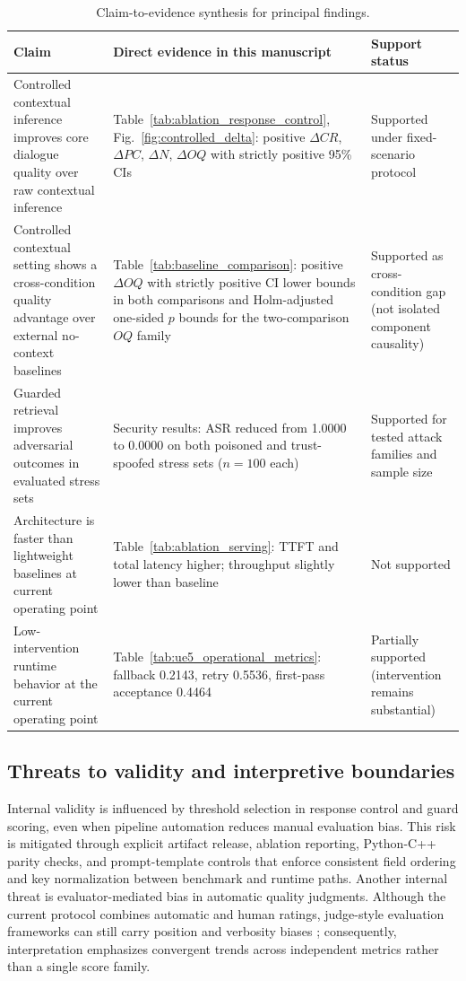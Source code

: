 ﻿\documentclass[a4paper,12pt]{article}
\begin{document}
\begin{table}[t]
\centering
\caption{Claim-to-evidence synthesis for principal findings.}
\label{tab:claim_evidence_map}
\begingroup
\footnotesize
\setlength{\tabcolsep}{4pt}
\begin{tabular}{p{}p{}p{}}
\toprule
Claim & Direct evidence in this manuscript & Support status \\
\midrule
Controlled contextual inference improves core dialogue quality over raw contextual inference & Table~\ref{tab:ablation_response_control}, Fig.~\ref{fig:controlled_delta}: positive \(\Delta CR\), \(\Delta PC\), \(\Delta N\), \(\Delta OQ\) with strictly positive 95\% CIs & Supported under fixed-scenario protocol \\
Controlled contextual setting shows a cross-condition quality advantage over external no-context baselines & Table~\ref{tab:baseline_comparison}: positive \(\Delta OQ\) with strictly positive CI lower bounds in both comparisons and Holm-adjusted one-sided \(p\) bounds for the two-comparison \(OQ\) family & Supported as cross-condition gap (not isolated component causality) \\
Guarded retrieval improves adversarial outcomes in evaluated stress sets & Security results: ASR reduced from 1.0000 to 0.0000 on both poisoned and trust-spoofed stress sets (\(n=100\) each) & Supported for tested attack families and sample size \\
Architecture is faster than lightweight baselines at current operating point & Table~\ref{tab:ablation_serving}: TTFT and total latency higher; throughput slightly lower than baseline & Not supported \\
Low-intervention runtime behavior at the current operating point & Table~\ref{tab:ue5_operational_metrics}: fallback 0.2143, retry 0.5536, first-pass acceptance 0.4464 & Partially supported (intervention remains substantial) \\
\bottomrule
\end{tabular}
\endgroup
\end{table}

\subsection{Threats to validity and interpretive boundaries}
Internal validity is influenced by threshold selection in response control and guard scoring, even when pipeline automation reduces manual evaluation bias. This risk is mitigated through explicit artifact release, ablation reporting, Python-C++ parity checks, and prompt-template controls that enforce consistent field ordering and key normalization between benchmark and runtime paths. Another internal threat is evaluator-mediated bias in automatic quality judgments. Although the current protocol combines automatic and human ratings, judge-style evaluation frameworks can still carry position and verbosity biases \cite{Zheng2023MTBench,Wang2024Judge,Dubois2024AlpacaEval}; consequently, interpretation emphasizes convergent trends across independent metrics rather than a single score family.
\end{document}
